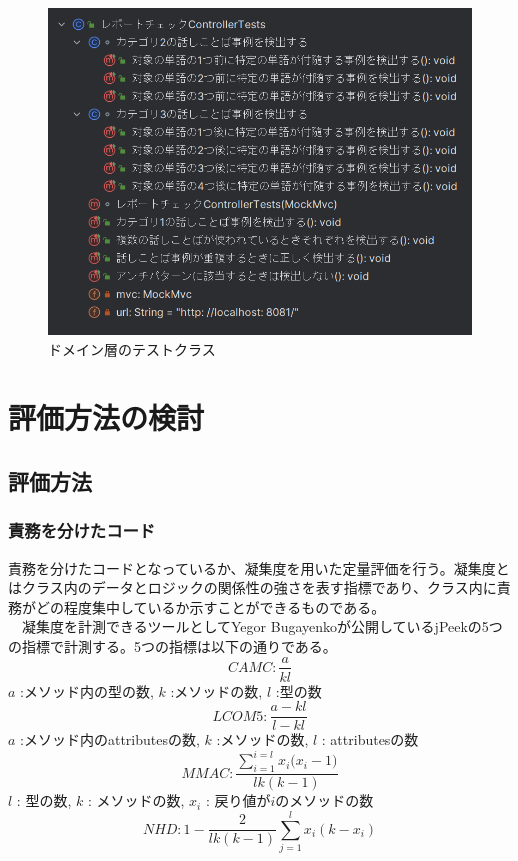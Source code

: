 \documentclass[12pt, a4paper]{jreport}
\begin{document}
\begin{figure}[H]
\centering
\includegraphics[width=1\linewidth]{image/domainTest.png}
\caption{ドメイン層のテストクラス}
\label{fig:enter-label}
\end{figure}
\chapter{評価方法の検討}
\section{評価方法}
\subsection{責務を分けたコード}
責務を分けたコードとなっているか、凝集度を用いた定量評価を行う。凝集度とはクラス内のデータとロジックの関係性の強さを表す指標であり、クラス内に責務がどの程度集中しているか示すことができるものである。
\\　凝集度を計測できるツールとしてYegor Bugayenkoが公開しているjPeekの5つの指標で計測する。5つの指標は以下の通りである。
\\
\begin{equation}
CAMC:
\frac{a}{kl}
\end{equation}
$a$ :メソッド内の型の数, $k$ :メソッドの数, $l$ :型の数
\begin{equation}
LCOM5:
\frac{a-kl}{l-kl}
\end{equation}
$a$ :メソッド内のattributesの数, $k$ :メソッドの数, $l$ : attributesの数
\begin{equation}
MMAC:
\frac{\sum^{i=l}_{i=1}{{x}_{i}{({x}_{i}-1})}}{lk(k-1)}
\end{equation}
$l$ : 型の数, $k$ : メソッドの数, ${x}_{i}$ : 戻り値が${i}$のメソッドの数
\begin{equation}
NHD:
1-\frac{2}{lk(k-1)}\sum^{l}_{j=1}{x}_{i}{(k-{x}_{i})}
\end{equation}
\end{document}
